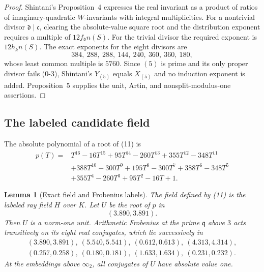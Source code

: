 \documentclass[11pt]{article}
\newtheorem{lemma}[theorem]{Lemma}
\begin{document}
\begin{proof}
Shintani's Proposition~4 expresses the real invariant as a product of
ratios of imaginary-quadratic $W$-invariants with integral
multiplicities.  For a nontrivial divisor $\mathfrak d\mid\mathfrak c$,
clearing the absolute-value square root and the distribution exponent
requires a multiple of $12f_{\mathfrak d}n(S)$.  For the trivial
divisor the required exponent is $12h_kn(S)$.  The exact exponents for
the eight divisors are
\[
 384,\ 288,\ 288,\ 144,\ 240,\ 360,\ 360,\ 180,
\]
whose least common multiple is $5760$.  Since $(5)$ is prime and its
only proper divisor fails (0-3), Shintani's $Y_{(5)}$ equals
$X_{(5)}$ and no induction exponent is added.  Proposition~5 supplies
the unit, Artin, and nonsplit-modulus-one assertions.
\end{proof}

\subsection{The labeled candidate field}

The absolute polynomial of a root of (11) is
\[
\begin{aligned}
p(T)={}&T^{16}-16T^{15}+95T^{14}-260T^{13}+355T^{12}
-348T^{11}\\
&+388T^{10}-300T^9+195T^8-300T^7+388T^6-348T^5\\
&+355T^4-260T^3+95T^2-16T+1.
\end{aligned}
\]

\begin{lemma}[Exact field and Frobenius labels]\label{lem:frobenius}
The field defined by (11) is the labeled ray field $H$ over $K$.
Let $U$ be the root of $p$ in
\[
 (3.890,3.891).
\]
Then $U$ is a norm-one unit.  Arithmetic Frobenius at the prime
$\mathfrak q$ above $3$ acts transitively on its eight real conjugates,
which lie successively in
\[
\begin{gathered}
(3.890,3.891),\ (5.540,5.541),\ (0.612,0.613),\
(4.313,4.314),\\
(0.257,0.258),\ (0.180,0.181),\ (1.633,1.634),\
(0.231,0.232).
\end{gathered}
\]
At the embeddings above $\infty_2$, all conjugates of $U$ have
absolute value one.
\end{lemma}
\end{document}
